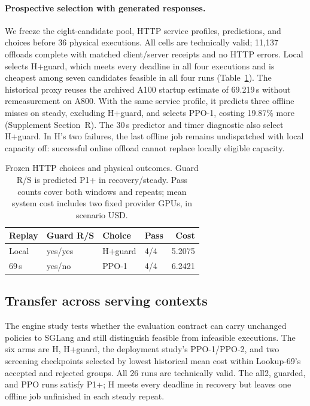 \paragraph{Prospective selection with generated responses.}
We freeze the eight-candidate pool, HTTP service profiles, predictions, and
choices before 36 physical executions. All cells are technically valid;
11,137 offloads complete with matched client/server receipts and no HTTP errors.
Local selects H+guard, which meets every deadline in all four executions
and is cheapest among seven candidates feasible in all four runs
(Table~\ref{tab:realapi-selection}). The historical proxy reuses the archived
A100 startup estimate of 69.219\,s without remeasurement on A800. With the same
service profile, it predicts three offline misses on steady, excluding H+guard, and
selects PPO-1, costing 19.87\% more (Supplement Section~R). The 30\,s predictor and timer diagnostic also select H+guard.
In H's two failures, the last offline job remains undispatched with local
capacity off: successful online offload cannot replace locally eligible capacity.

\begin{table}[t]
\centering\small
\caption{Frozen HTTP choices and physical outcomes. Guard R/S is predicted
P1+ in recovery/steady. Pass counts cover both windows and repeats; mean
system cost includes two fixed provider GPUs, in scenario USD.}
\label{tab:realapi-selection}
\setlength{\tabcolsep}{3pt}
\begin{tabular*}{\linewidth}{@{\extracolsep{\fill}}llllr@{}}
\toprule
Replay & Guard R/S & Choice & Pass & Cost\\
\midrule
Local & yes/yes & H+guard & 4/4 & 5.2075\\
69\,s & yes/no & PPO-1 & 4/4 & 6.2421\\
\bottomrule
\end{tabular*}
\end{table}

\subsection{Transfer across serving contexts}
\label{sec:e4}
The engine study tests whether the evaluation contract can carry unchanged policies to
SGLang and still distinguish feasible from infeasible executions. The six
arms are H, H+guard, the deployment study's PPO-1/PPO-2, and two screening checkpoints selected by
lowest historical mean cost within Lookup-69's accepted and rejected groups.
All 26 runs are technically valid. The all2, guarded, and PPO runs satisfy P1+; H meets every deadline in recovery but
leaves one offline job unfinished in each steady repeat.

